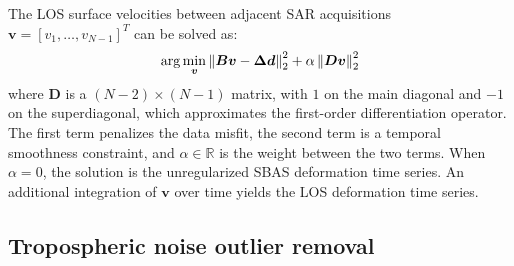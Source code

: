 The LOS surface velocities between adjacent SAR acquisitions $ \bm{v} = \left[v_1 , \ldots , v_{N-1} \right]^T $ can be solved as:
\begin{equation}
	\arg \min_{\bm{v} } \left\lVert \bm{Bv} - \bm{\Delta d}   \right\rVert^2_2 + \alpha \left\lVert \bm{Dv} \right\rVert^2_2  \label{eq:ch4-sbas}
\end{equation}
where $ \bm{D} $ is a $ (N-2) \times (N-1) $ matrix, with $1$ on the main diagonal and $-1$ on the superdiagonal, which approximates the first-order differentiation operator. The first term penalizes the data misfit, the second term is a temporal smoothness constraint, and $ \alpha \in \mathbb{R} $ is the weight between the two terms. When $ \alpha = 0 $, the solution is the unregularized SBAS deformation time series. An additional integration of $\mathbf{v}$ over time yields the LOS deformation time series.





%


\subsection{Tropospheric noise outlier removal}
\label{sec:ch4-outlier-method}

